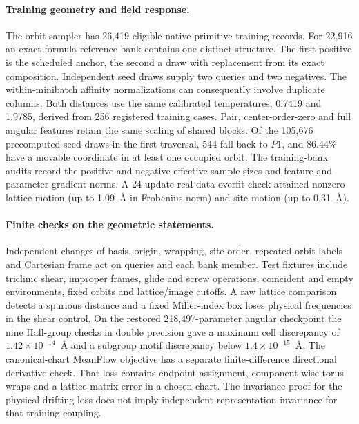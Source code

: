 \paragraph{Training geometry and field response.} The orbit sampler has 26,419 eligible native primitive training records. For 22,916 an exact-formula reference bank contains one distinct structure. The first positive is the scheduled anchor, the second a draw with replacement from its exact composition. Independent seed draws supply two queries and two negatives. The within-minibatch affinity normalizations can consequently involve duplicate columns. Both distances use the same calibrated temperatures, 0.7419 and 1.9785, derived from 256 registered training cases. Pair, center-order-zero and full angular features retain the same scaling of shared blocks. Of the 105,676 precomputed seed draws in the first traversal, 544 fall back to $P1$, and 86.44\% have a movable coordinate in at least one occupied orbit. The training-bank audits record the positive and negative effective sample sizes and feature and parameter gradient norms. A 24-update real-data overfit check attained nonzero lattice motion (up to 1.09~\AA{} in Frobenius norm) and site motion (up to 0.31~\AA).

\paragraph{Finite checks on the geometric statements.} Independent changes of basis, origin, wrapping, site order, repeated-orbit labels and Cartesian frame act on queries and each bank member. Test fixtures include triclinic shear, improper frames, glide and screw operations, coincident and empty environments, fixed orbits and lattice/image cutoffs. A raw lattice comparison detects a spurious distance and a fixed Miller-index box loses physical frequencies in the shear control. On the restored 218,497-parameter angular checkpoint the nine Hall-group checks in double precision gave a maximum cell discrepancy of $1.42\times10^{-14}$~\AA{} and a subgroup motif discrepancy below $1.4\times10^{-15}$~\AA. The canonical-chart MeanFlow objective has a separate finite-difference directional derivative check. That loss contains endpoint assignment, component-wise torus wraps and a lattice-matrix error in a chosen chart. The invariance proof for the physical drifting loss does not imply independent-representation invariance for that training coupling.

